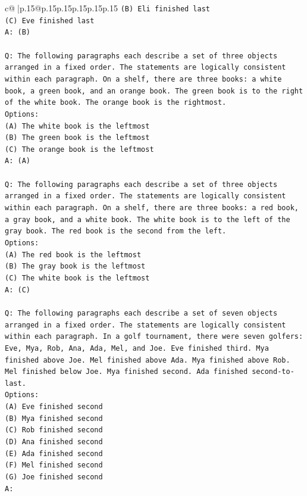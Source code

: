 \documentclass{article}
\begin{document}
{\begin{supertabular}{c@{$\;$}|p{.15\linewidth}@{}p{.15\linewidth}p{.15\linewidth}p{.15\linewidth}p{.15\linewidth}p{.15\linewidth}}
{{{\texttt{(B) Eli finished last} \\
\texttt{(C) Eve finished last} \\
\texttt{A: (B)} \\
\\ 
\texttt{Q: The following paragraphs each describe a set of three objects arranged in a fixed order. The statements are logically consistent within each paragraph. On a shelf, there are three books: a white book, a green book, and an orange book. The green book is to the right of the white book. The orange book is the rightmost.} \\
\texttt{Options:} \\
\texttt{(A) The white book is the leftmost} \\
\texttt{(B) The green book is the leftmost} \\
\texttt{(C) The orange book is the leftmost} \\
\texttt{A: (A)} \\
\\ 
\texttt{Q: The following paragraphs each describe a set of three objects arranged in a fixed order. The statements are logically consistent within each paragraph. On a shelf, there are three books: a red book, a gray book, and a white book. The white book is to the left of the gray book. The red book is the second from the left.} \\
\texttt{Options:} \\
\texttt{(A) The red book is the leftmost} \\
\texttt{(B) The gray book is the leftmost} \\
\texttt{(C) The white book is the leftmost} \\
\texttt{A: (C)} \\
\\ 
\texttt{Q: The following paragraphs each describe a set of seven objects arranged in a fixed order. The statements are logically consistent within each paragraph. In a golf tournament, there were seven golfers: Eve, Mya, Rob, Ana, Ada, Mel, and Joe. Eve finished third. Mya finished above Joe. Mel finished above Ada. Mya finished above Rob. Mel finished below Joe. Mya finished second. Ada finished second{-}to{-}last.} \\
\texttt{Options:} \\
\texttt{(A) Eve finished second} \\
\texttt{(B) Mya finished second} \\
\texttt{(C) Rob finished second} \\
\texttt{(D) Ana finished second} \\
\texttt{(E) Ada finished second} \\
\texttt{(F) Mel finished second} \\
\texttt{(G) Joe finished second} \\
\texttt{A:} \\
            }
        }
    }
     \\ \\


\end{supertabular}}
\end{document}
